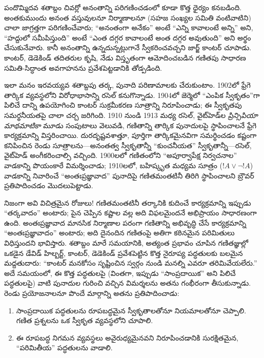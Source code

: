\documentclass[../../../include/open-logic-section]{subfiles}
\begin{document}
పందొమ్మిదవ శతాబ్దం చివర్లో అనంతాన్ని పరిగణించడంలో కూడా కొత్త ధైర్యం కనబడింది.
అంతకుముందు అనంత వస్తువులనూ నిర్మాణాలనూ (సహజ సంఖ్యల సమితి వంటివాటిని) చాలా
జాగ్రత్తగా పరిగణించేవారు; ``అనంతంగా అనేకం'' అంటే ``ఎన్ని కావాలంటే అన్ని'' అని,
``హద్దులో సమీపిస్తుంది'' అంటే ``ఎంత దగ్గర కావాలంటే అంత దగ్గర అవుతుంది'' అని
అర్థం చేసుకునేవారు. కానీ అనంతాన్ని ఉన్నదున్నట్లుగానే స్వీకరించవచ్చని జార్జ్
కాంటర్ చూపాడు. కాంటర్, డెడెకిండ్ తదితరుల కృషి, నేడు విస్తృతంగా ఆమోదించబడిన
గణితపు సాధారణ సమితి-సిద్ధాంత అవగాహనను ప్రవేశపెట్టడానికి తోడ్పడింది.

ఇలా మనం ఇరవయ్యవ శతాబ్దపు తర్క, పునాది పరిణామాలకు చేరుకుంటాం. 1902లో ఫ్రేగె
తార్కిక వ్యవస్థలోని విరోధాభాసాన్ని రసెల్ కనుగొన్నాడు. 1904లో జెర్మెలో
``ఎంపిక స్వీకృతం''గా పిలిచే దాన్ని ఉపయోగించి కాంటర్ సుక్రమీకరణ సూత్రాన్ని
నిరూపించాడు; ఈ స్వీకృతపు సమర్థనీయతపై చాలా చర్చ జరిగింది. 1910 నుండి 1913 మధ్య
రసెల్, వైట్‌హెడ్‌ల \emph{ప్రిన్సిపియా మాథమాటికా} మూడు సంపుటాలు వెలువడి,
గణితాన్ని తార్కిక పునాదులపై స్థాపించాలనే ఫ్రేగె కార్యక్రమాన్ని విస్తరించాయి.
దురదృష్టవశాత్తూ, పూర్తిగా తార్కికమైనవిగా సమర్థించడం కష్టంగా కనిపించిన రెండు
సూత్రాలను---అనంతత్వ స్వీకృతాన్నీ ``కుంచనీయత'' స్వీకృతాన్నీ---రసెల్, వైట్‌హెడ్
అంగీకరించాల్సి వచ్చింది. 1900లలో గణితంలోని ``అపూర్వాపేక్ష నిర్వచనాల'' వాడకాన్ని
పొయంకారే విమర్శించాడు; 1910లలో, బహిష్కృత మధ్యమ సూత్రం ($!A \lor \lnot !A$)
వాడకాన్ని నివారించే ``అంతఃప్రజ్ఞావాద'' పునాదిపై గణితమంతటినీ తిరిగి స్థాపించాలని
బ్రౌవర్ ప్రతిపాదించడం మొదలుపెట్టాడు.

నిజంగా అవి విచిత్రమైన రోజులు!{} గణితమంతటినీ తర్కానికి కుదించే కార్యక్రమాన్ని
ఇప్పుడు ``తర్కవాదం'' అంటారు; పైన చెప్పిన కష్టాల వల్ల అది విఫలమైందనే అభిప్రాయం
సాధారణంగా ఉంది. అంతఃప్రజ్ఞావాద మానసిక నిర్మాణాల పరంగా గణితాన్ని అభివృద్ధి చేసే
కార్యక్రమాన్ని ``అంతఃప్రజ్ఞావాదం'' అంటారు; అది దైనందిన గణితంపై అతిగా కఠినమైన
పరిమితులు విధిస్తుందని భావిస్తారు. శతాబ్దం మారే సమయానికి, అత్యంత ప్రభావం చూపిన
గణితజ్ఞుల్లో ఒకడైన డేవిడ్ హిల్బర్ట్, కాంటర్, డెడెకిండ్ ప్రవేశపెట్టిన కొత్త నైరూప్య
పద్ధతులకు బలమైన మద్దతుదారు: ``కాంటర్ మనకోసం సృష్టించిన స్వర్గం నుండి మనల్ని
ఎవరూ తరిమివేయలేరు.'' అదే సమయంలో, ఈ కొత్త పద్ధతులపై (వింతగా, ఇప్పుడు
``సాంప్రదాయిక'' అని పిలిచే పద్ధతులపై) వాటి పునాదుల గురించి వచ్చిన విమర్శలను అతను గంభీరంగా
తీసుకున్నాడు. రెండు ప్రయోజనాలనూ పొందే మార్గాన్ని అతను ప్రతిపాదించాడు:
\begin{enumerate}
\item సాంప్రదాయిక పద్ధతులను రూపబద్ధమైన స్వీకృతాలతోనూ నియమాలతోనూ చెప్పాలి.
  గణిత ప్రశ్నలను ఒక స్వీకృత వ్యవస్థలోని  చూపాలి.
\item ఈ రూపబద్ధ నిగమన వ్యవస్థలు అవైరుధ్యమైనవని నిరూపించడానికి సురక్షితమైన,
  ``పరిమితీయ'' పద్ధతులను వాడాలి.
\end{enumerate}
\end{document}
